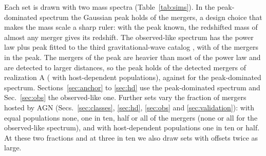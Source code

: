 \documentclass[aps,prd,reprint,twocolumn,superscriptaddress,nofootinbib,floatfix,nolongbibliography]{revtex4-2}
\begin{document}
Each set is drawn with two mass spectra (Table~\ref{tab:sims}). In the
peak-dominated spectrum the Gaussian peak holds \MockPeakFrac{} of the
mergers, a design choice that makes the mass scale a sharp ruler:
with the peak known, the redshifted mass of almost any merger gives its
redshift. The observed-like spectrum has the power law plus peak fitted to
the third gravitational-wave catalog \cite{KAGRA:2021duu}, with
\ObsPeakFrac{} of the mergers in the peak. The mergers of the peak are
heavier than most of the power law and are detected to larger distances, so
the peak holds \ObsDetPeakShare{} of the detected mergers of realization A
(\ObsHDDetPeakShare{} with host-dependent populations), against
\MockDetPeakShare{} for the peak-dominated spectrum.
Sections~\ref{sec:anchor} to \ref{sec:hd} use the peak-dominated spectrum and
Sec.~\ref{sec:obs} the observed-like one. Further sets vary the fraction of
mergers hosted by AGN (Secs.~\ref{sec:classes}, \ref{sec:hd}, \ref{sec:obs}
and \ref{sec:validation}): with equal populations none, one in ten, half or
all of the mergers (none or all for the observed-like spectrum), and with
host-dependent populations one in ten or half. At these two fractions and at
three in ten we also draw sets with offsets twice as large.
\end{document}
